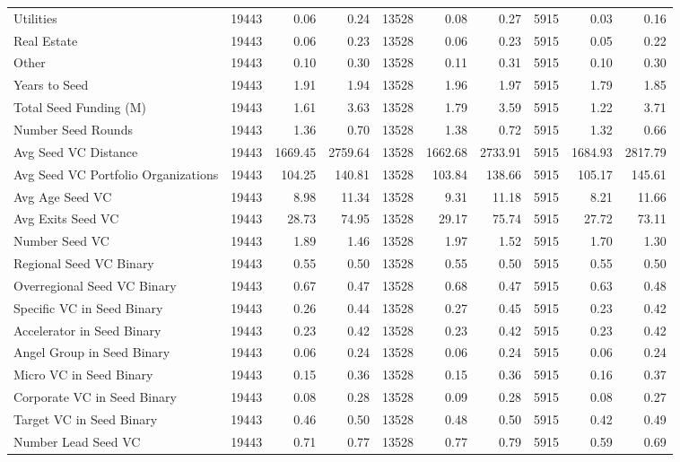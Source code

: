 {\begin{table}[!h]
{\begin{tabular}[t]{lrrrrrrrrr}
Utilities & 19443 & 0.06 & 0.24 & 13528 & 0.08 & 0.27 & 5915 & 0.03 & 0.16\\
Real Estate & 19443 & 0.06 & 0.23 & 13528 & 0.06 & 0.23 & 5915 & 0.05 & 0.22\\
Other & 19443 & 0.10 & 0.30 & 13528 & 0.11 & 0.31 & 5915 & 0.10 & 0.30\\
Years to Seed & 19443 & 1.91 & 1.94 & 13528 & 1.96 & 1.97 & 5915 & 1.79 & 1.85\\
\addlinespace
Total Seed Funding (M) & 19443 & 1.61 & 3.63 & 13528 & 1.79 & 3.59 & 5915 & 1.22 & 3.71\\
Number Seed Rounds & 19443 & 1.36 & 0.70 & 13528 & 1.38 & 0.72 & 5915 & 1.32 & 0.66\\
Avg Seed VC Distance & 19443 & 1669.45 & 2759.64 & 13528 & 1662.68 & 2733.91 & 5915 & 1684.93 & 2817.79\\
Avg Seed VC Portfolio Organizations & 19443 & 104.25 & 140.81 & 13528 & 103.84 & 138.66 & 5915 & 105.17 & 145.61\\
Avg Age Seed VC & 19443 & 8.98 & 11.34 & 13528 & 9.31 & 11.18 & 5915 & 8.21 & 11.66\\
\addlinespace
Avg Exits Seed VC & 19443 & 28.73 & 74.95 & 13528 & 29.17 & 75.74 & 5915 & 27.72 & 73.11\\
Number Seed VC & 19443 & 1.89 & 1.46 & 13528 & 1.97 & 1.52 & 5915 & 1.70 & 1.30\\
Regional Seed VC Binary & 19443 & 0.55 & 0.50 & 13528 & 0.55 & 0.50 & 5915 & 0.55 & 0.50\\
Overregional Seed VC Binary & 19443 & 0.67 & 0.47 & 13528 & 0.68 & 0.47 & 5915 & 0.63 & 0.48\\
Specific VC in Seed Binary & 19443 & 0.26 & 0.44 & 13528 & 0.27 & 0.45 & 5915 & 0.23 & 0.42\\
\addlinespace
Accelerator in Seed Binary & 19443 & 0.23 & 0.42 & 13528 & 0.23 & 0.42 & 5915 & 0.23 & 0.42\\
Angel Group in Seed Binary & 19443 & 0.06 & 0.24 & 13528 & 0.06 & 0.24 & 5915 & 0.06 & 0.24\\
Micro VC in Seed Binary & 19443 & 0.15 & 0.36 & 13528 & 0.15 & 0.36 & 5915 & 0.16 & 0.37\\
Corporate VC in Seed Binary & 19443 & 0.08 & 0.28 & 13528 & 0.09 & 0.28 & 5915 & 0.08 & 0.27\\
Target VC in Seed Binary & 19443 & 0.46 & 0.50 & 13528 & 0.48 & 0.50 & 5915 & 0.42 & 0.49\\
\addlinespace
Number Lead Seed VC & 19443 & 0.71 & 0.77 & 13528 & 0.77 & 0.79 & 5915 & 0.59 & 0.69\\

\end{tabular}}
\end{table}}
